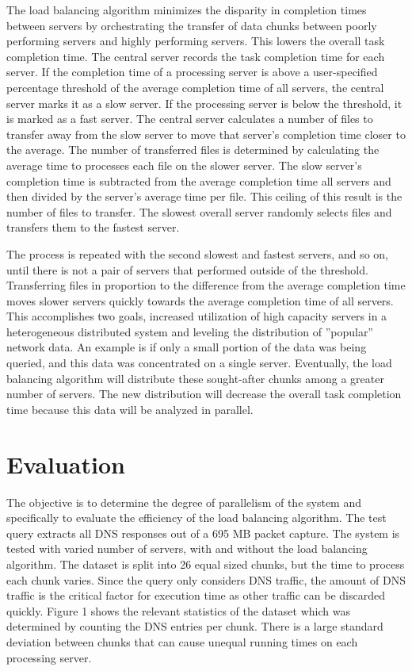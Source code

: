 \documentclass{article}
\begin{document}
\begin{multicols}{2}
The load balancing algorithm minimizes the disparity in completion times between servers by orchestrating the transfer of data chunks between poorly performing servers and highly performing servers. This lowers the overall task completion time.  The central server records the task completion time for each server.  If the completion time of a processing server is above a user-specified percentage threshold of the average completion time of all servers, the central server marks it as a slow server. If the processing server is below the threshold, it is marked as a fast server.  The central server calculates a number of files to transfer away from the slow server to move that server's completion time closer to the average. The number of transferred files is determined by calculating the average time to processes each file on the slower server. The slow server's completion time is subtracted from the average completion time all servers and then divided by the server's average time per file. This ceiling of this result is the number of files to transfer. The slowest overall server randomly selects files and transfers them to the fastest server.

The process is repeated with the second slowest and fastest servers, and so on, until there is not a pair of servers that performed outside of the threshold.  Transferring files in proportion to the difference from the average completion time moves slower servers quickly towards the average completion time of all servers.  This accomplishes two goals, increased utilization of high capacity servers in a heterogeneous distributed system and leveling the distribution of ''popular'' network data.  An example is if only a small portion of the data was being queried, and this data was concentrated on a single server.  Eventually, the load balancing algorithm will distribute these sought-after chunks among a greater number of servers. The new distribution will decrease the overall task completion time because this data will be analyzed in parallel. 

\section*{Evaluation} 


The objective is to determine the degree of parallelism of the system and specifically to evaluate the efficiency of the load balancing algorithm. The test query extracts all DNS responses out of a 695 MB packet capture. The system is tested with varied number of servers, with and without the load balancing algorithm.  The dataset is split into 26 equal sized chunks, but the time to process each chunk varies.  Since the query only considers DNS traffic, the amount of DNS traffic is the critical factor for execution time as other traffic can be discarded quickly.  Figure 1 shows the relevant statistics of the dataset which was determined by counting the DNS entries per chunk.  There is a large standard deviation between chunks that can cause unequal running times on each processing server.



\end{multicols}
\end{document}
